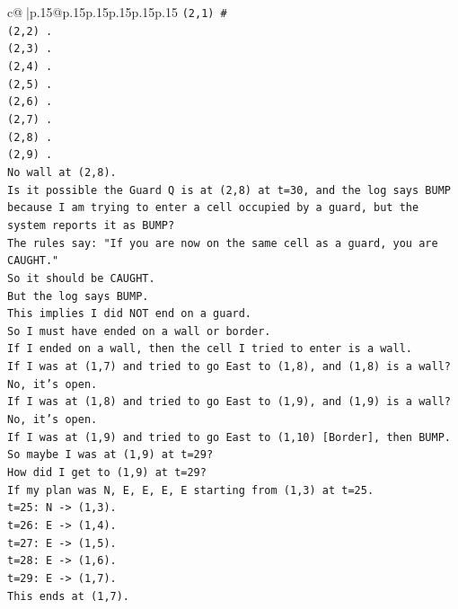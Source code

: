 \documentclass{article}
\begin{document}
{\begin{supertabular}{c@{$\;$}|p{.15\linewidth}@{}p{.15\linewidth}p{.15\linewidth}p{.15\linewidth}p{.15\linewidth}p{.15\linewidth}}
{{{\texttt{(2,1) \#} \\
\texttt{(2,2) .} \\
\texttt{(2,3) .} \\
\texttt{(2,4) .} \\
\texttt{(2,5) .} \\
\texttt{(2,6) .} \\
\texttt{(2,7) .} \\
\texttt{(2,8) .} \\
\texttt{(2,9) .} \\
\texttt{No wall at (2,8).} \\
\texttt{Is it possible the Guard Q is at (2,8) at t=30, and the log says BUMP because I am trying to enter a cell occupied by a guard, but the system reports it as BUMP?} \\
\texttt{The rules say: "If you are now on the same cell as a guard, you are CAUGHT."} \\
\texttt{So it should be CAUGHT.} \\
\texttt{But the log says BUMP.} \\
\texttt{This implies I did NOT end on a guard.} \\
\texttt{So I must have ended on a wall or border.} \\
\texttt{If I ended on a wall, then the cell I tried to enter is a wall.} \\
\texttt{If I was at (1,7) and tried to go East to (1,8), and (1,8) is a wall?} \\
\texttt{No, it's open.} \\
\texttt{If I was at (1,8) and tried to go East to (1,9), and (1,9) is a wall?} \\
\texttt{No, it's open.} \\
\texttt{If I was at (1,9) and tried to go East to (1,10) {[}Border{]}, then BUMP.} \\
\texttt{So maybe I was at (1,9) at t=29?} \\
\texttt{How did I get to (1,9) at t=29?} \\
\texttt{If my plan was N, E, E, E, E starting from (1,3) at t=25.} \\
\texttt{t=25: N {-}> (1,3).} \\
\texttt{t=26: E {-}> (1,4).} \\
\texttt{t=27: E {-}> (1,5).} \\
\texttt{t=28: E {-}> (1,6).} \\
\texttt{t=29: E {-}> (1,7).} \\
\texttt{This ends at (1,7).} \\
}}}
\end{supertabular}}
\end{document}
